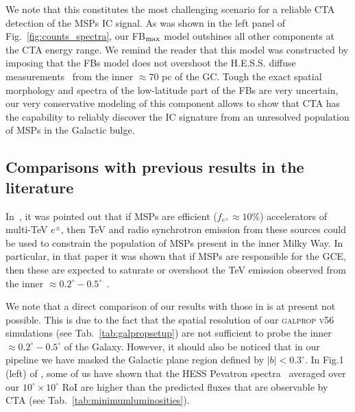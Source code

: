 \documentclass[doublespace,nopageskip]{VTthesis} %
\begin{document}
We note that this constitutes the most challenging scenario for a reliable CTA detection of the MSPs IC signal. As was shown in the left panel of Fig.~\ref{fig:counts_spectra}, our FB$_{\rm max}$ model outshines all other components at the CTA energy range. We remind the reader that this model was constructed by imposing that the FBs model does not overshoot the H.E.S.S. diffuse  measurements~\citep{2016Natur.531..476H} from the inner $\approx 70$ pc of the GC. Tough the exact spatial morphology and spectra of the low-latitude part of the FBs are very uncertain, our very conservative modeling of this component allows to show that CTA has the capability to reliably discover the IC signature from an unresolved population of MSPs in the Galactic bulge.    
 
\subsection{Comparisons with previous results in the literature}
 
In~\citet{2018PhRvD..98d3005H}, it was pointed out that if MSPs are efficient ($f_{e^\pm}\approx 10\%$) accelerators of multi-TeV $e^\pm$, then TeV and radio synchrotron emission from these sources could be used to constrain the population of MSPs present in the inner Milky Way. In particular, in that paper it was shown that if MSPs are responsible for the GCE, then these are expected to saturate or overshoot the TeV emission observed from the inner $\approx 0.2^\circ-0.5^\circ$~\citep{2016Natur.531..476H}. 
 
We note that a direct comparison of our results with those in \citet{2018PhRvD..98d3005H} is at present not possible. This is due to the fact that the spatial resolution of our \textsc{galprop v56} simulations (see Tab.~\ref{tab:galpropsetup}) are not sufficient to probe the inner $\approx 0.2^\circ-0.5^\circ$ of the Galaxy. However, it should also be noticed that in our pipeline we have masked the Galactic plane region defined by $|b|<0.3^\circ$. In Fig.1 (left) of \citep{2021PhRvD.103b3011R}, some of us have shown that the HESS Pevatron spectra~\citep{2016Natur.531..476H} averaged over our $10^\circ \times 10^\circ$ RoI are higher than the predicted fluxes that are observable by CTA (see Tab.~\ref{tab:minimumluminosities}). 
\end{document}
